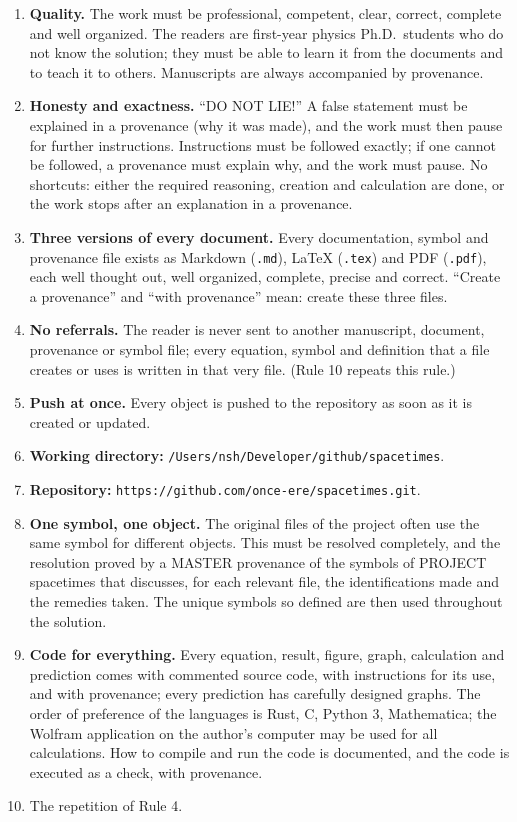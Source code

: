 \documentclass[
  10pt,
]{article}
\providecommand{\tightlist}{%
  \setlength{\itemsep}{0pt}\setlength{\parskip}{0pt}}
\begin{document}
\begin{enumerate}
\def\labelenumi{\arabic{enumi}.}
\tightlist
\item
  \textbf{Quality.} The work must be professional, competent, clear,
  correct, complete and well organized. The readers are first-year
  physics Ph.D.~students who do not know the solution; they must be able
  to learn it from the documents and to teach it to others. Manuscripts
  are always accompanied by provenance.
\item
  \textbf{Honesty and exactness.} ``DO NOT LIE!'' A false statement must
  be explained in a provenance (why it was made), and the work must then
  pause for further instructions. Instructions must be followed exactly;
  if one cannot be followed, a provenance must explain why, and the work
  must pause. No shortcuts: either the required reasoning, creation and
  calculation are done, or the work stops after an explanation in a
  provenance.
\item
  \textbf{Three versions of every document.} Every documentation, symbol
  and provenance file exists as Markdown (\texttt{.md}), LaTeX
  (\texttt{.tex}) and PDF (\texttt{.pdf}), each well thought out, well
  organized, complete, precise and correct. ``Create a provenance'' and
  ``with provenance'' mean: create these three files.
\item
  \textbf{No referrals.} The reader is never sent to another manuscript,
  document, provenance or symbol file; every equation, symbol and
  definition that a file creates or uses is written in that very file.
  (Rule 10 repeats this rule.)
\item
  \textbf{Push at once.} Every object is pushed to the repository as
  soon as it is created or updated.
\item
  \textbf{Working directory:}
  \texttt{/Users/nsh/Developer/github/spacetimes}.
\item
  \textbf{Repository:}
  \texttt{https://github.com/once-ere/spacetimes.git}.
\item
  \textbf{One symbol, one object.} The original files of the project
  often use the same symbol for different objects. This must be resolved
  completely, and the resolution proved by a MASTER provenance of the
  symbols of PROJECT spacetimes that discusses, for each relevant file,
  the identifications made and the remedies taken. The unique symbols so
  defined are then used throughout the solution.
\item
  \textbf{Code for everything.} Every equation, result, figure, graph,
  calculation and prediction comes with commented source code, with
  instructions for its use, and with provenance; every prediction has
  carefully designed graphs. The order of preference of the languages is
  Rust, C, Python 3, Mathematica; the Wolfram application on the
  author's computer may be used for all calculations. How to compile and
  run the code is documented, and the code is executed as a check, with
  provenance.
\item
  The repetition of Rule 4.
\end{enumerate}
\end{document}

